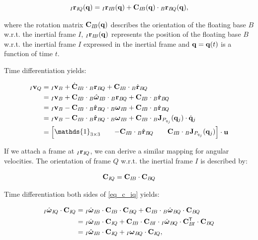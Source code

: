 \documentclass[10pt,landscape,a4paper]{article}
\newcommand\identity{\mathds{1}}
\newcommand\transpose{\mathsf{T}}
\newcommand\pos[3]{{}_#1\vr_{#2\!#3}}
\newcommand\posdot[3]{{}_#1\dot{\vr}_{#2\!#3}}
\newcommand\poshat[3]{{}_#1\hat{\vr}_{#2\!#3}}
\newcommand\comat[2]{\vC_{#1\!#2}}
\newcommand\dcomat[2]{\dot{\vC}_{#1\!#2}}
\newcommand\rotvel[3]{{}_#1\vom_{#2\!#3}}
\newcommand\rotvelhat[3]{{}_#1\hat{\vom}_{#2\!#3}}
\begin{document}
\begin{multicols}{2}
\begin{equation}
\pos{I}{I}{Q}(\vq) = \pos{I}{I}{B}(\vq) + \comat{I}{B}(\vq) \cdot \pos{B}{B}{Q}(\vq),
\end{equation}

where the rotation matrix $\comat{I}{B}(\vq)$ describes the orientation of the floating base $B$ w.r.t. the inertial frame $I$, $\pos{I}{I}{B}(\vq)$ represents the position of the floating base $B$ w.r.t. the inertial frame $I$ expressed in the inertial frame and $\mathbf q = \mathbf q(t)$ is a function of time $t$.


Time differentiation yields:

\begin{equation}
\begin{aligned}
{}_I \vv_{Q} 
&= {}_I \vv_{B} + \dcomat{I}{B} \cdot \pos{B}{B}{Q} + \comat{I}{B} \cdot \posdot{B}{B}{Q} \\
&= {}_I \vv_{B} + \comat{I}{B} \cdot \rotvelhat{B}{I}{B} \cdot \pos{B}{B}{Q} + \comat{I}{B} \cdot \posdot{B}{B}{Q} \\
&= {}_I \vv_{B} - \comat{I}{B} \cdot \poshat{B}{B}{Q} \cdot \rotvel{B}{I}{B} + \comat{I}{B} \cdot \posdot{B}{B}{Q} \\
&= {}_I \vv_{B} - \comat{I}{B} \cdot \poshat{B}{B}{Q} \cdot \rotvel{B}{I}{B} + \comat{I}{B} \cdot {}_B \vJ_{P_{q_j}}(\vq_j) \cdot \dot{\vq}_j \\
&=
\begin{bmatrix}
\identity_{3\times 3} && -\comat{I}{B} \cdot \poshat{B}{B}{Q} && \comat{I}{B} \cdot {}_B \vJ_{P_{q_j}}(\vq_j)
\end{bmatrix}
\cdot \vu
\end{aligned}
\end{equation}

If we attach a frame at $\pos{I}{I}{Q}$, we can derive a similar mapping for angular velocities. The orientation of frame $Q$ w.r.t. the inertial frame $I$ is described by:

\begin{equation}\label{eq_c_iq}
\comat{I}{Q} = \comat{I}{B} \cdot \comat{B}{Q}
\end{equation}

Time differentiation both sides of \eqref{eq_c_iq} yields:

\begin{equation}
\begin{aligned}
\rotvelhat{I}{I}{Q} \cdot \comat{I}{Q}
&= \rotvelhat{I}{I}{B} \cdot \comat{I}{B} \cdot \comat{B}{Q} + \comat{I}{B} \cdot \rotvelhat{B}{B}{Q} \cdot \comat{B}{Q} \\
&= \rotvelhat{I}{I}{B} \cdot \comat{I}{Q} + \comat{I}{B} \cdot \comat{B}{I} \cdot \rotvelhat{I}{B}{Q} \cdot \comat{B}{I}^\transpose \cdot \comat{B}{Q} \\
&= \rotvelhat{I}{I}{B} \cdot \comat{I}{Q} + \rotvel{I}{B}{Q} \cdot \comat{I}{Q},
\end{aligned}
\end{equation}


\end{multicols}
\end{document}
